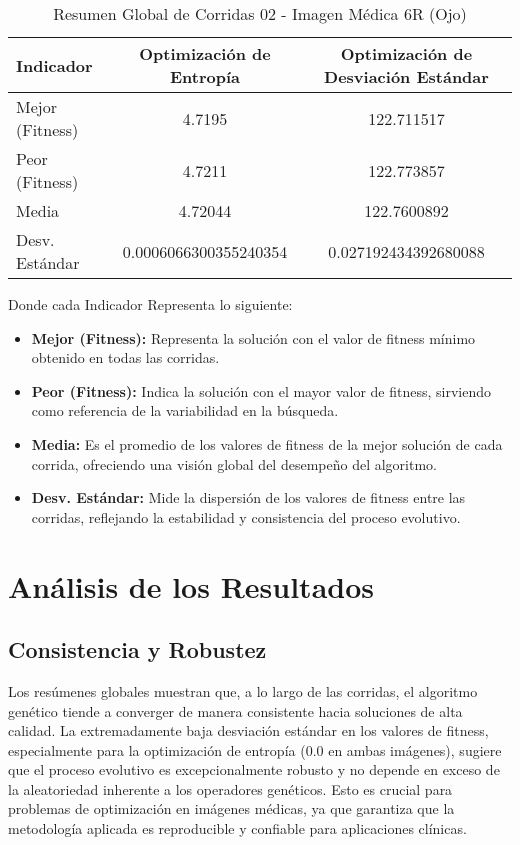 \begin{table}[H]
    \centering
    \caption{Resumen Global de Corridas 02 - Imagen Médica 6R (Ojo)}
    \begin{tabular}{lcc}
    \hline
    \textbf{Indicador} & \textbf{Optimización de Entropía} & \textbf{Optimización de Desviación Estándar} \\
    \hline
    Mejor (Fitness) & 4.7195 & 122.711517 \\
    Peor (Fitness) & 4.7211 & 122.773857 \\
    Media & 4.72044 & 122.7600892 \\
    Desv. Estándar & 0.0006066300355240354 & 0.027192434392680088 \\
    \hline
    \end{tabular}
\end{table}

Donde cada Indicador Representa lo siguiente:
\begin{itemize}
    \item \textbf{Mejor (Fitness):} Representa la solución con el valor de fitness mínimo obtenido en todas las corridas.
    \item \textbf{Peor (Fitness):} Indica la solución con el mayor valor de fitness, sirviendo como referencia de la variabilidad en la búsqueda.
    \item \textbf{Media:} Es el promedio de los valores de fitness de la mejor solución de cada corrida, ofreciendo una visión global del desempeño del algoritmo.
    \item \textbf{Desv. Estándar:} Mide la dispersión de los valores de fitness entre las corridas, reflejando la estabilidad y consistencia del proceso evolutivo.
\end{itemize}

\section{Análisis de los Resultados}

\subsection{Consistencia y Robustez}
Los resúmenes globales muestran que, a lo largo de las corridas, el algoritmo genético tiende a converger de manera consistente hacia soluciones de alta calidad. La extremadamente baja desviación estándar en los valores de fitness, especialmente para la optimización de entropía (0.0 en ambas imágenes), sugiere que el proceso evolutivo es excepcionalmente robusto y no depende en exceso de la aleatoriedad inherente a los operadores genéticos. Esto es crucial para problemas de optimización en imágenes médicas, ya que garantiza que la metodología aplicada es reproducible y confiable para aplicaciones clínicas.


